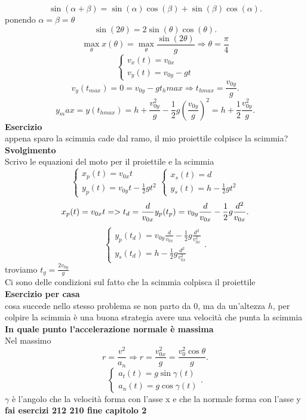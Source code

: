 \documentclass[12px]{article}
\begin{document}
	\[
	\sin(\alpha + \beta) = \sin(\alpha)\cos(\beta) + \sin(\beta)\cos(\alpha)
	.\] 
	ponendo $\alpha=\beta = \theta$
	 \[
	\sin(2\theta) = 2\sin(\theta)\cos(\theta)
	.\] 
	\[
		\max_\theta x(\theta) = \max_\theta \frac{\sin(2\theta)} g \Rightarrow \theta = \frac \pi 4
	\]\[
	\begin{cases}
		v_x(t) = v_{0x}\\
		v_y(t) = v_{0y} - gt
	\end{cases}\]
	\[
		v_y(t_{max}) = 0 = v_{0y} - gt_h{max} \Rightarrow t_{hmax} = \frac { v_{0y}} g
	.\] 
	\[
		y_max = y(t_{hmax}) = h + \frac {v_{0y}^2} g - \frac 12 g \left(\frac {v_{0y}}g \right)^2 = h + \frac 12 \frac{v_{0y}^2} g
	.\] 
	\textbf{Esercizio}\\
	appena sparo la scimmia cade dal ramo, il mio proiettile colpisce la scimmia?\\
	\textbf{Svolgimento}\\
	Scrivo le equazioni del moto per il proiettile e la scimmia\\
	\[
	\begin{cases}
		x_p(t) = v_{0x}t\\
		y_p(t) = v_{0y}t - \frac 12 gt^2
	\end{cases}
\begin{cases}
	x_s(t) = d\\
	y_s(t) = h - \frac 12 gt^2
\end{cases}
\]
\[
x_p(t) = v_{0x}t => t_d = \frac d{v_{0x}}\\
y_p(t_p) = v_{0y}\frac d {v_{0x}} - \frac 12 g \frac {d^2}{v_{0x}}
.\] 
\[
\begin{cases}
	y_p(t_d) = v_{0y}\frac d{v_{0x}} - \frac 12 g \frac {d^2}{v_{0x}^2}\\
	y_s(t_d) = h - \frac 12 g\frac {d^2}{v_{0x}^2}
\end{cases}
.\] 
troviamo $t_g = \frac {2v_{0y}}g$\\
Ci sono delle condizioni sul fatto che la scimmia colpisca il proiettile\\
\textbf{Esercizio per casa}\\
cosa succede nello stesso problema se non parto da 0, ma da un'altezza $h$, per colpire la scimmia è una buona strategia avere una velocità che punta la scimmia\\
\textbf{In quale punto l'accelerazione normale è massima}\\
Nel massimo
\[
	r = \frac {v^2} {a_n} \Rightarrow r = \frac {v_{0x}^2}{g} = \frac{v_0^2\cos\theta}g
.\] 
\[
\begin{cases}
	a_t(t)=g\sin\gamma(t)\\
	a_n(t)=g\cos\gamma(t)
\end{cases}
.\] 
$\gamma$ è l'angolo che la velocità forma con l'asse x e che la normale forma con l'asse y\\
\textbf{fai esercizi 212 210 fine capitolo 2}\\
\end{document}
